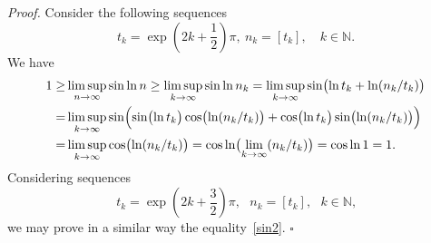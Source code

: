 \documentclass[11pt]{article}
\begin{document}
\emph{Proof.}
Consider the following sequences 
\begin{equation*}
t_{k}=\exp \left( 2k+\frac{1}{2}\right) \pi ,\ n_{k}=[ t_{k}]
,\quad k\in \mathbb{N}.
\end{equation*}%
We have%
\begin{equation*}
\begin{split}
1\ge & \limsup_{n\to \infty }\sin \ln n\ge \limsup_{k\to
\infty }\sin \ln n_{k}
=\limsup_{k\to \infty }\sin \bigl(\ln t_{k}+\ln (n_{k}/t_{k})\bigr) \\
= & \limsup_{k\to \infty }\sin \Bigl(\sin \bigl(\ln t_{k}\bigr)\cos %
\bigl(\ln (n_{k}/t_{k})\bigr) 
+\cos \bigl(\ln t_{k}\bigr)\sin \bigl(\ln
(n_{k}/t_{k})\bigr)\Bigr) \\
= &\limsup_{k\to \infty }\cos \bigl(\ln (n_{k}/t_{k})\bigr)=\cos \ln %
\bigl(\lim_{k\to \infty }(n_{k}/t_{k})\bigr) 
=\cos \ln 1=1.
\end{split}
\end{equation*}%
Considering sequences 
\begin{equation*}
t_{k}=\exp \left( 2k+\frac{3}{2}\right) \pi ,\text{ }n_{k}=[ t_{k}%
] ,\text{ }k\in \mathbb{N}\text{,}
\end{equation*}%
we may prove in a similar way the equality~\eqref{sin2}.
\hfill $\square$
\end{document}
